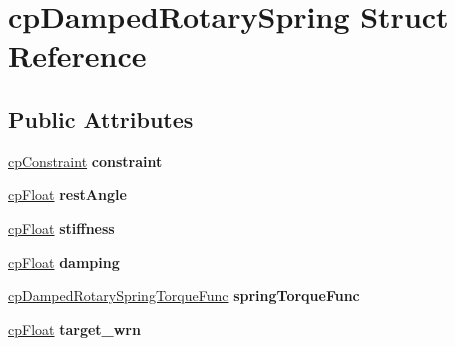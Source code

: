 \hypertarget{structcp_damped_rotary_spring}{}\section{cp\+Damped\+Rotary\+Spring Struct Reference}
\label{structcp_damped_rotary_spring}
\subsection*{Public Attributes}
\begin{DoxyCompactItemize}
\item 
\mbox{\label{structcp_damped_rotary_spring_a57fd3d4154ca7f372245053e6953d3c6}} 
\mbox{\hyperlink{structcp_constraint}{cp\+Constraint}} {\bfseries constraint}
\item 
\mbox{\label{structcp_damped_rotary_spring_a4a821b6b0e54400d892ce92d6990acdc}} 
\mbox{\hyperlink{group__basic_types_gac1ed65573e035bf892505768c852d8d3}{cp\+Float}} {\bfseries rest\+Angle}
\item 
\mbox{\label{structcp_damped_rotary_spring_ac2804128c9b92915ac8687367ff7c1ee}} 
\mbox{\hyperlink{group__basic_types_gac1ed65573e035bf892505768c852d8d3}{cp\+Float}} {\bfseries stiffness}
\item 
\mbox{\label{structcp_damped_rotary_spring_a3e85982c0b4f5aca75740fb83e5cae65}} 
\mbox{\hyperlink{group__basic_types_gac1ed65573e035bf892505768c852d8d3}{cp\+Float}} {\bfseries damping}
\item 
\mbox{\label{structcp_damped_rotary_spring_ab4bed9fc4db268dee126b07fe65ee8c3}} 
\mbox{\hyperlink{group__cp_damped_rotary_spring_ga072c236959020fab4f30087b5234040b}{cp\+Damped\+Rotary\+Spring\+Torque\+Func}} {\bfseries spring\+Torque\+Func}
\item 
\mbox{\label{structcp_damped_rotary_spring_aa92c6904380fe7f8f4fe9b0d76805885}} 
\mbox{\hyperlink{group__basic_types_gac1ed65573e035bf892505768c852d8d3}{cp\+Float}} {\bfseries target\+\_\+wrn}
\item 
\mbox{\label{structcp_damped_rotary_spring_a79e849ee8a77d2e9e433723f5e255a36}} 

\end{DoxyCompactItemize}
